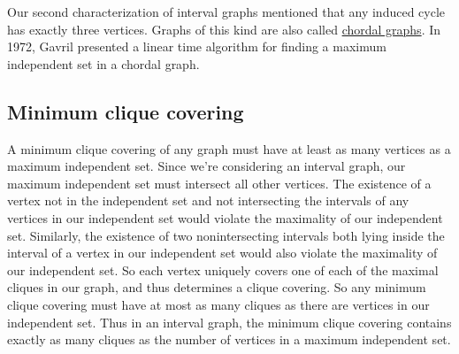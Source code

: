 \documentclass[11pt]{article}
\begin{document}
Our second characterization of interval graphs mentioned that any induced cycle has exactly three vertices.
Graphs of this kind are also called \underline{chordal graphs}.
In 1972, Gavril presented a linear time algorithm for finding a maximum independent set in a chordal graph. \cite{Gavril}


\subsection{Minimum clique covering}

A minimum clique covering of any graph must have at least as many vertices as a maximum independent set.
Since we're considering an interval graph, our maximum independent set must intersect all other vertices.
The existence of a vertex not in the independent set and not intersecting the intervals of any vertices in our independent set would violate the maximality of our independent set.
Similarly, the existence of two nonintersecting intervals both lying inside the interval of a vertex in our independent set would also violate the maximality of our independent set.
So each vertex uniquely covers one of each of the maximal cliques in our graph, and thus determines a clique covering.
So any minimum clique covering must have at most as many cliques as there are vertices in our independent set.
Thus in an interval graph, the minimum clique covering contains exactly as many cliques as the number of vertices in a maximum independent set.




\end{document}

